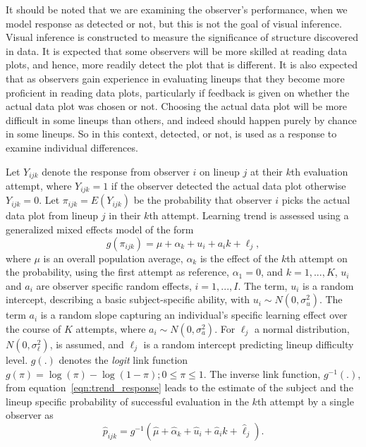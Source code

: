 \documentclass[10pt]{article}\usepackage[]{graphicx}\usepackage[]{xcolor}
\begin{document}
It should be noted that we are examining the observer's performance, when we model response as detected or not, but this is not the goal of visual inference. Visual inference is constructed to measure the significance of structure discovered in data. It is expected that some observers will be more skilled at reading data plots, and hence, more readily detect the plot that is different. It is also expected that as observers gain experience in evaluating lineups that they become more proficient in reading data plots, particularly if feedback is given on whether the actual data plot was chosen or not. Choosing the actual data plot will be more difficult in some lineups than others, and indeed should happen purely by chance in some lineups. So in this context, detected, or not, is used as a response to examine individual differences. 

Let $Y_{ijk}$ denote the response from observer $i$ on lineup $j$ at their $k$th evaluation attempt, where $Y_{ijk}=1$ if the observer detected the actual data plot otherwise  $Y_{ijk}=0$. Let $\pi_{ijk}=  E(Y_{ijk})$ be the probability that  observer $i$ picks the actual data plot from lineup $j$ in their $k$th attempt. Learning trend is assessed using a generalized mixed effects model of the form
\begin{equation} \label{eqn:trend_response}
g( \pi_{ijk} )= \mu + \alpha_k + u_i +  a_{i} k + \ell_j,  
\end{equation}
where $\mu$ is an overall population average, $\alpha_k$ is the effect of the $k$th attempt on the probability, using the first attempt as reference, $\alpha_1 = 0$, and $k = 1, ..., K$, $u_i$ and $a_i$ are observer specific random effects, $i = 1, ..., I$. The term, $u_i$ is a random intercept, describing a basic subject-specific ability, with $u_i \sim N(0, \sigma_u^2)$. 
The term $a_i$ is a random slope capturing an individual's specific learning effect over the course of $K$ attempts, where $a_i \sim N(0, \sigma_a^2)$. 
For $\ell_j$ a normal distribution, $N(0, \sigma_\ell^2)$, is assumed, and $\ell_j$ is a random intercept predicting lineup difficulty level. $g(.)$ denotes the {\it logit} link function $g(\pi)=\log(\pi) - \log(1-\pi); 0 \le \pi \le 1$. The inverse link function, $g^{-1}(.)$, from equation~\ref{eqn:trend_response} leads to the estimate of the subject and the lineup specific probability of successful evaluation in the $k$th attempt by a single observer as 
\begin{equation} \label{eqn:trend_power}
\hat p_{ijk} =  g^{-1}(\hat{\mu} + \hat{\alpha}_k + \hat{u}_i +  \hat{a}_i k + \hat{\ell}_j).
\end{equation}
\end{document}
